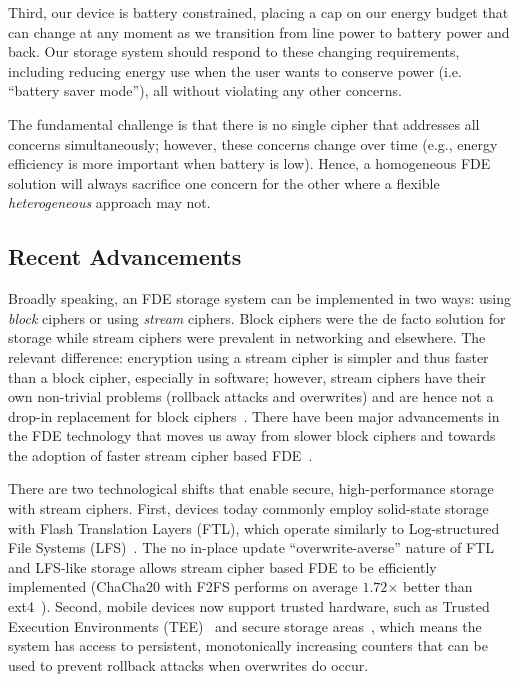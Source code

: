 Third, our device is battery constrained, placing a cap on our energy budget
that can change at any moment as we transition from line power to battery power
and back. Our storage system should respond to these changing requirements,
including reducing energy use when the user wants to conserve power (i.e.
``battery saver mode''), all without violating any other concerns.

The fundamental challenge is that there is no single cipher that addresses all
concerns simultaneously; however, these concerns change over time (e.g., energy
efficiency is more important when battery is low). Hence, a homogeneous FDE
solution will always sacrifice one concern for the other where a flexible {\em
heterogeneous} approach may not.


\subsection{Recent Advancements}

Broadly speaking, an FDE storage system can be implemented in two ways: using
{\em block} ciphers or using {\em stream} ciphers. Block ciphers were the de
facto solution for storage while stream ciphers were prevalent in networking and
elsewhere. The relevant difference: encryption using a stream cipher is simpler
and thus faster than a block cipher, especially in software; however, stream
ciphers have their own non-trivial problems (\ie rollback attacks and
overwrites) and are hence not a drop-in replacement for block
ciphers~\cite{StrongBox}. There have been major advancements in the FDE
technology that moves us away from slower block ciphers and towards the adoption
of faster stream cipher based FDE~\cite{Adiantum, StrongBox}.

There are two technological shifts that enable secure, high-performance storage
with stream ciphers. First, devices today commonly employ solid-state storage
with Flash Translation Layers (FTL), which operate similarly to Log-structured
File Systems (LFS)~\cite{LFS, F2FS, NILFS}. The no in-place update
``overwrite-averse'' nature of FTL and LFS-like storage allows stream cipher
based FDE to be efficiently implemented (\eg ChaCha20 with F2FS performs on
average $1.72$× better than ext4~\cite{StrongBox}). Second, mobile devices now
support trusted hardware, such as Trusted Execution Environments
(TEE)~\cite{TrustZone, TEE} and secure storage areas~\cite{eMMC-standard}, which
means the system has access to persistent, monotonically increasing counters
that can be used to prevent rollback attacks when overwrites do occur.


